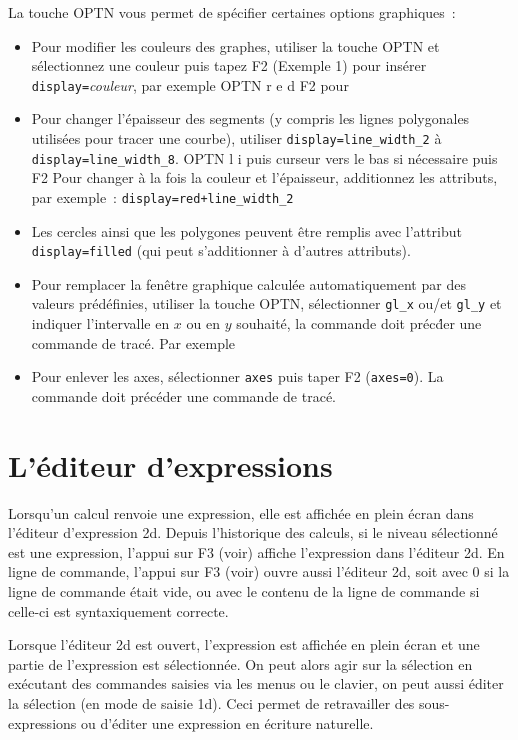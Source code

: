 \documentclass{article}
\begin{document}
\begin{giacjshere}
La touche OPTN vous permet de sp\'ecifier certaines options graphiques~:
\begin{itemize}
\item Pour modifier les couleurs des graphes, utiliser la touche OPTN
et s\'electionnez une couleur puis tapez F2 (Exemple 1) pour ins\'erer
\verb|display=|{\em couleur}, par exemple OPTN r e d F2 pour
\item Pour changer l'\'epaisseur des segments (y compris les lignes
polygonales utilis\'ees pour tracer une courbe), utiliser
\verb|display=line_width_2| \`a \verb|display=line_width_8|.
OPTN l i puis curseur vers le bas si n\'ecessaire puis F2
Pour changer \`a la fois la couleur et l'\'epaisseur, additionnez les
attributs, par exemple~:
\verb|display=red+line_width_2|
\item Les cercles ainsi que les polygones 
peuvent \^etre remplis avec l'attribut
\verb|display=filled| (qui peut s'additionner \`a d'autres attributs).
\item Pour remplacer la fen\^etre graphique calcul\'ee automatiquement
par des valeurs pr\'ed\'efinies, utiliser la touche OPTN,
s\'electionner \verb|gl_x| ou/et \verb|gl_y| et indiquer l'intervalle
en $x$ ou en $y$ souhait\'e, la commande doit pr\'ec\'der une
commande de trac\'e. Par exemple 
\item
Pour enlever les axes, s\'electionner \verb|axes| puis taper F2 
(\verb|axes=0|). La commande doit pr\'ec\'eder une commande de
trac\'e.
\end{itemize}

\section{L'\'editeur d'expressions}
Lorsqu'un calcul renvoie une expression, elle est affich\'ee en plein 
\'ecran dans
l'\'editeur d'expression 2d. Depuis l'historique des calculs, si le niveau
s\'electionn\'e est une expression, l'appui sur F3 (voir) affiche
l'expression dans l'\'editeur 2d. En ligne de commande, l'appui
sur F3 (voir) ouvre aussi l'\'editeur 2d, soit avec 0 si la ligne
de commande \'etait vide, ou avec le contenu de la ligne de commande si
celle-ci est syntaxiquement correcte.

Lorsque l'\'editeur 2d est ouvert, l'expression est affich\'ee en
plein \'ecran et une
partie de l'expression est s\'electionn\'ee. On peut alors agir sur
la s\'election en ex\'ecutant des commandes saisies via les menus
ou le clavier, on peut aussi \'editer la s\'election (en mode de saisie
1d). Ceci permet de retravailler des sous-expressions
ou d'\'editer une expression en \'ecriture naturelle.


\end{giacjshere}
\end{document}
